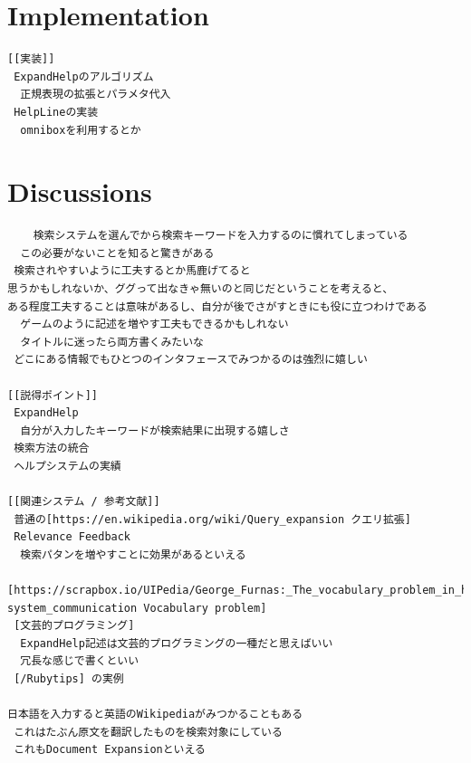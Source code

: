 \documentclass[manuscript,screen,review]{acmart}
\begin{document}
\section{Implementation}

\begin{verbatim}
[[実装]]
 ExpandHelpのアルゴリズム
  正規表現の拡張とパラメタ代入
 HelpLineの実装
  omniboxを利用するとか
\end{verbatim}

\section{Discussions}

\begin{verbatim}
    検索システムを選んでから検索キーワードを入力するのに慣れてしまっている
  この必要がないことを知ると驚きがある
 検索されやすいように工夫するとか馬鹿げてると
思うかもしれないか、ググって出なきゃ無いのと同じだということを考えると、
ある程度工夫することは意味があるし、自分が後でさがすときにも役に立つわけである
  ゲームのように記述を増やす工夫もできるかもしれない
  タイトルに迷ったら両方書くみたいな
 どこにある情報でもひとつのインタフェースでみつかるのは強烈に嬉しい

[[説得ポイント]]
 ExpandHelp
  自分が入力したキーワードが検索結果に出現する嬉しさ
 検索方法の統合
 ヘルプシステムの実績

[[関連システム / 参考文献]]
 普通の[https://en.wikipedia.org/wiki/Query_expansion クエリ拡張]
 Relevance Feedback
  検索パタンを増やすことに効果があるといえる
 [https://scrapbox.io/UIPedia/George_Furnas:_The_vocabulary_problem_in_human-system_communication Vocabulary problem]
 [文芸的プログラミング]
  ExpandHelp記述は文芸的プログラミングの一種だと思えばいい
  冗長な感じで書くといい
 [/Rubytips] の実例

日本語を入力すると英語のWikipediaがみつかることもある
 これはたぶん原文を翻訳したものを検索対象にしている
 これもDocument Expansionといえる

\end{verbatim}
\end{document}
